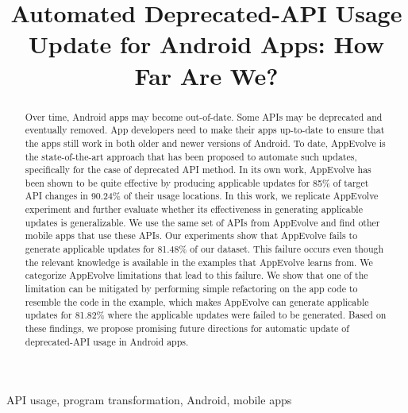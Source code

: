 \documentclass[conference]{IEEEtran}
\begin{document}
\def \toolname {AppEvolve}
\title{Automated Deprecated-API Usage Update for Android Apps: How Far Are We?}

\maketitle

\begin{abstract}
Over time, Android apps may become out-of-date. Some APIs may be deprecated and eventually removed. App developers need to make their apps up-to-date to ensure that the apps still work in both older and newer versions of Android. %
To date, AppEvolve is the state-of-the-art approach that has been proposed to automate such updates, specifically for the case of deprecated API method. In its own work, AppEvolve has been shown to be quite effective by producing applicable updates for 85\% of target API changes in 90.24\% of their usage locations. In this work, we replicate AppEvolve experiment and further evaluate whether its effectiveness in generating applicable updates is generalizable. We use the same set of APIs from AppEvolve and find other mobile apps that use these APIs. Our experiments show that AppEvolve fails to generate applicable updates for 81.48\% of our dataset. This failure occurs even though the relevant knowledge is available in the examples that AppEvolve learns from. We categorize AppEvolve limitations that lead to this failure. %
We show that one of the limitation can be mitigated by performing simple refactoring on the app code to resemble the code in the example, which makes AppEvolve can generate applicable updates for 81.82\% where the applicable updates were failed to be generated. Based on these findings, we propose promising future directions for automatic update of deprecated-API usage in Android apps. 

\end{abstract}

\begin{IEEEkeywords}
API usage, program transformation, Android, mobile apps
\end{IEEEkeywords}
\end{document}
